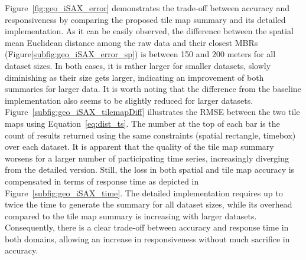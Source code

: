 Figure~\ref{fig:geo_iSAX_error} demonstrates the  trade-off between accuracy and responsiveness by comparing the proposed tile map summary and its detailed implementation. As it can be easily observed, the difference between the spatial mean Euclidean distance among the raw data and their closest MBRs (Figure\ref{subfig:geo_iSAX_error_sp}) is between 150 and 200 meters for all dataset sizes. In both cases, it is rather larger for smaller datasets, slowly diminishing as their size gets larger, indicating an improvement of both summaries for larger data. It is worth noting that the difference from the baseline implementation also seems to be slightly reduced for larger datasets. Figure~\ref{subfig:geo_iSAX_tilemapDiff} illustrates the RMSE between the two tile maps using Equation~\ref{eq:dist_ts}. The number at the top of each bar is the count of results returned using the same constraints (spatial rectangle, timebox) over each dataset. It is apparent that the quality of the tile map summary worsens for a larger number of participating time series, increasingly diverging from the detailed version. Still, the loss in both spatial and tile map accuracy is compensated in terms of response time as depicted in Figure~\ref{subfig:geo_iSAX_time}. The detailed implementation requires up to twice the time to generate the summary for all dataset sizes, while its overhead compared to the tile map summary is increasing with larger datasets. Consequently, there is a clear trade-off between accuracy and response time in both domains, allowing an increase in responsiveness without much sacrifice in accuracy.

